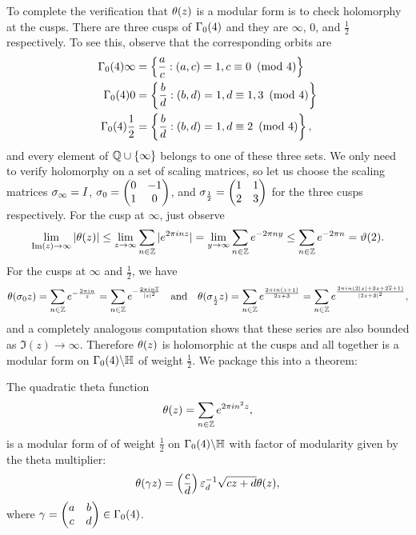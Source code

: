 \documentclass[12pt,oneside]{book}
\begin{document}
      To complete the verification that $\theta(z)$ is a modular form is to check holomorphy at the cusps. There are three cusps of $\Gamma_{0}(4)$ and they are $\infty$, $0$, and $\frac{1}{2}$ respectively. To see this, observe that the corresponding orbits are
      \begin{align*}
        \Gamma_{0}(4)\infty &= \left\{\frac{a}{c}:(a,c) = 1, c \equiv 0 \ \left(\text{mod }4\right) \right\} \\
        \Gamma_{0}(4)0 &= \left\{\frac{b}{d}:(b,d) = 1, d \equiv 1,3 \ \left(\text{mod }4\right) \right\} \\
        \Gamma_{0}(4)\frac{1}{2} &= \left\{\frac{b}{d}:(b,d) = 1, d \equiv 2 \ \left(\text{mod }4\right) \right\},
      \end{align*}
      and every element of $\mathbb{Q} \cup \{\infty\}$ belongs to one of these three sets. We only need to verify holomorphy on a set of scaling matrices, so let us choose the scaling matrices $\sigma_{\infty} = I$, $\sigma_{0} = \begin{pmatrix} 0 & -1 \\ 1 & 0 \end{pmatrix}$, and $\sigma_{\frac{1}{2}} = \begin{pmatrix} 1 & 1 \\ 2 & 3 \end{pmatrix}$ for the three cusps respectively. For the cusp at $\infty$, just observe
      \[
        \lim_{\mathrm{Im}(z) \to \infty}|\theta(z)| \le \lim_{z \to \infty}\sum_{n \in \mathbb{Z}}|e^{2\pi inz}| = \lim_{y \to \infty}\sum_{n \in \mathbb{Z}}e^{-2\pi ny} \le \sum_{n \in \mathbb{Z}}e^{-2\pi n} = \vartheta(2).
      \]
      For the cusps at $\infty$ and $\frac{1}{2}$, we have
      \[
        \theta(\sigma_{0} z) = \sum_{n \in \mathbb{Z}}e^{-\frac{2\pi in}{z}} = \sum_{n \in \mathbb{Z}}e^{-\frac{2\pi in\overline{z}}{|z|^{2}}} \quad \text{and} \quad \theta(\sigma_{\frac{1}{2}} z) = \sum_{n \in \mathbb{Z}}e^{\frac{2\pi in(z+1)}{2z+3}} = \sum_{n \in \mathbb{Z}}e^{\frac{2\pi in(2|z|+3z+2\overline{z}+1)}{|2z+3|^{2}}},
      \]
      and a completely analogous computation shows that these series are also bounded as $\Im(z) \to \infty$. Therefore $\theta(z)$ is holomorphic at the cusps and all together is a modular form on $\Gamma_{0}(4)\backslash\mathbb{H}$ of weight $\frac{1}{2}$. We package this into a theorem:

      \begin{theorem}
        The quadratic theta function
        \[
            \theta(z) = \sum_{n \in \mathbb{Z}}e^{2\pi in^{2}z},
        \]
        is a modular form of of weight $\frac{1}{2}$ on $\Gamma_{0}(4)\backslash\mathbb{H}$ with factor of modularity given by the theta multiplier:
        \[
          \theta(\gamma z) = \left(\frac{c}{d}\right)\varepsilon_{d}^{-1}\sqrt{cz+d}\theta(z),
        \]
        where $\gamma = \begin{pmatrix} a & b \\ c & d \end{pmatrix} \in \Gamma_{0}(4)$.
      \end{theorem}
\end{document}
